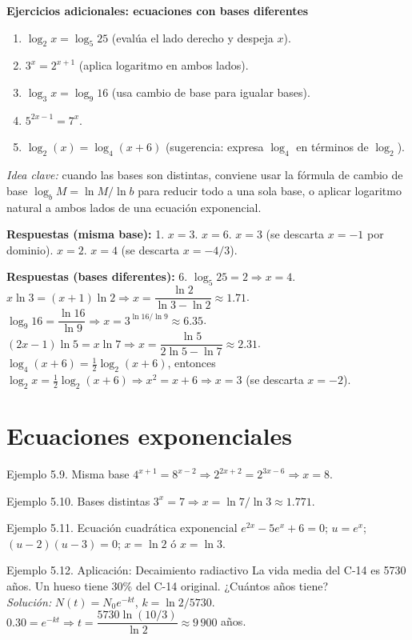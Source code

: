 \documentclass[12pt,letterpaper]{book}
\begin{document}
\textbf{Ejercicios adicionales: ecuaciones con bases diferentes}
\begin{enumerate}
\item $\log_2 x=\log_5 25$ (evalúa el lado derecho y despeja $x$).
\item $3^{x}=2^{x+1}$ (aplica logaritmo en ambos lados).
\item $\log_3 x=\log_9 16$ (usa cambio de base para igualar bases).
\item $5^{2x-1}=7^{x}$.
\item $\log_2(x)=\log_4(x+6)$ (sugerencia: expresa $\log_4$ en términos de $\log_2$).
\end{enumerate}
\textit{Idea clave:} cuando las bases son distintas, conviene usar la fórmula de cambio de base $\log_bM=\ln M/\ln b$ para reducir todo a una sola base, o aplicar logaritmo natural a ambos lados de una ecuación exponencial.

\textbf{Respuestas (misma base):} 1. $x=3$. $x=6$. $x=3$ (se descarta $x=-1$ por dominio). $x=2$. $x=4$ (se descarta $x=-4/3$).

\textbf{Respuestas (bases diferentes):} 6. $\log_5 25=2\Rightarrow x=4$. $x\ln3=(x+1)\ln2\Rightarrow x=\dfrac{\ln2}{\ln3-\ln2}\approx1.71$. $\log_9 16=\dfrac{\ln16}{\ln9}\Rightarrow x=3^{\ln16/\ln9}\approx6.35$. $(2x-1)\ln5=x\ln7\Rightarrow x=\dfrac{\ln5}{2\ln5-\ln7}\approx2.31$. $\log_4(x+6)=\tfrac12\log_2(x+6)$, entonces $\log_2x=\tfrac12\log_2(x+6)\Rightarrow x^2=x+6\Rightarrow x=3$ (se descarta $x=-2$).

\section{Ecuaciones exponenciales}

\begin{ejbox}{Ejemplo 5.9. Misma base}
$4^{x+1}=8^{x-2}\Rightarrow2^{2x+2}=2^{3x-6}\Rightarrow x=8$.
\end{ejbox}

\begin{ejbox}{Ejemplo 5.10. Bases distintas}
$3^x=7\Rightarrow x=\ln7/\ln3\approx1.771$.
\end{ejbox}

\begin{ejbox}{Ejemplo 5.11. Ecuación cuadrática exponencial}
$e^{2x}-5e^x+6=0$; $u=e^x$; $(u-2)(u-3)=0$; $x=\ln2$ ó $x=\ln3$.
\end{ejbox}

\begin{ejbox}{Ejemplo 5.12. Aplicación: Decaimiento radiactivo}
La vida media del C-14 es 5730 años. Un hueso tiene 30\% del C-14 original. ¿Cuántos años tiene?\\
\textit{Solución:} $N(t)=N_0e^{-kt}$, $k=\ln2/5730$. $0.30=e^{-kt}\Rightarrow t=\dfrac{5730\ln(10/3)}{\ln2}\approx9\,900$ años.
\end{ejbox}
\end{document}
